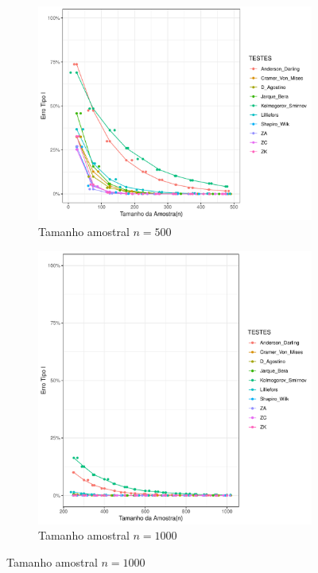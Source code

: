 \documentclass[a4paper,11pt]{article} %
\begin{document}
\begin{figure}[H]
    \vspace{0.5cm} %
    \begin{subfigure}[b]{0.45\textwidth}
        \centering
        \includegraphics[width=\textwidth]{Distribuição Beta/Erro Tipo I/erro_tipo_I_beta_500.pdf}
        \caption{Tamanho amostral \(n = 500\)}
        \label{fig:beta_500}
    \end{subfigure}
    \hfill
    \begin{subfigure}[b]{0.45\textwidth}
        \centering
        \includegraphics[width=\textwidth]{Distribuição Beta/Erro Tipo I/erro_tipo_I_beta_1000.pdf}
        \caption{Tamanho amostral \(n = 1000\)}
        \label{fig:beta_1000}
    \end{subfigure}
\end{figure}
\end{document}
